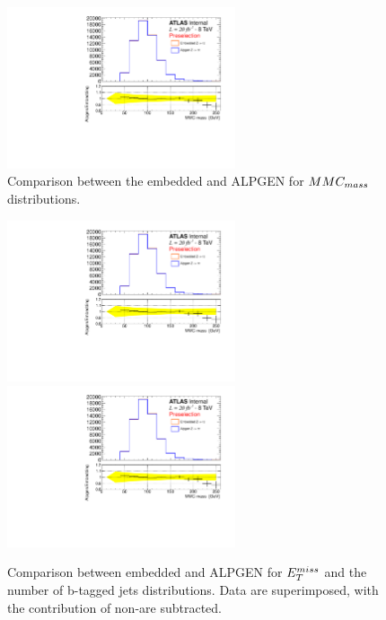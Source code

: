 \begin{figure}[tp]
     \begin{center}

            \includegraphics[page=1, width=0.6\textwidth]{figure/bg_estimation/std_plots_emb.pdf}
\end{center}
    \caption{Comparison between the embedded \Ztautau and ALPGEN for $MMC_{mass}$ distributions.}
   \label{fig:emb_vs_alp1}
\end{figure}


\begin{figure}[tp]
     \begin{center}

           \includegraphics[page=2, width=0.6\textwidth]{figure/bg_estimation/std_plots_emb.pdf}
            \includegraphics[page=3, width=0.6\textwidth]{figure/bg_estimation/std_plots_emb.pdf}

    \end{center}
    \caption{Comparison between embedded \Ztautau and ALPGEN for $E_{T}^{miss}$ and the number of b-tagged jets distributions.
	Data are superimposed, with the contribution of non-\Ztautau are subtracted.}
   \label{fig:emb_vs_alp}
\end{figure}


